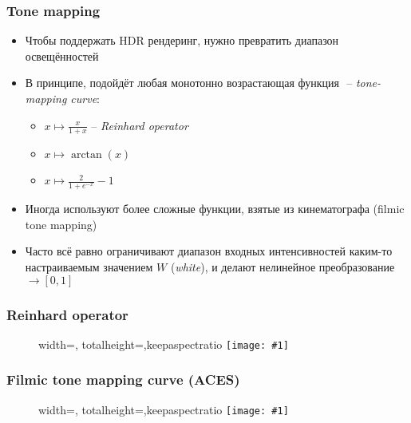 \documentclass[10pt]{beamer}
\newcommand{\slideimage}[1]{
  \begin{figure}
    \begin{adjustbox}{width=\textwidth, totalheight=\textheight-2\baselineskip-2\baselineskip,keepaspectratio}
      \texttt{[image: \#1]}
    \end{adjustbox}
  \end{figure}
}
\begin{document}
\begin{frame}[fragile]
\frametitle{Tone mapping}
\begin{itemize}
\item Чтобы поддержать HDR рендеринг, нужно превратить диапазон освещённостей \begin{math}[0, \infty)\end{math} в диапазон \begin{math}[0, 1]\end{math}
\pause
\item В принципе, подойдёт любая монотонно возрастающая функция \begin{math}[0, \infty)\rightarrow [0, 1]\end{math} -- \textit{tone-mapping curve}:
\begin{itemize}
\item \begin{math}x \mapsto \frac{x}{1+x}\end{math} -- \textit{Reinhard operator}
\item \begin{math}x \mapsto \arctan(x)\end{math}
\item \begin{math}x \mapsto \frac{2}{1+e^{-x}}-1\end{math}
\end{itemize}
\pause
\item Иногда используют более сложные функции, взятые из кинематографа (filmic tone mapping)
\pause
\item Часто всё равно ограничивают диапазон входных интенсивностей каким-то настраиваемым значением \begin{math}W\end{math} (\textit{white}), и делают нелинейное преобразование \begin{math}[0, W] \rightarrow [0, 1]\end{math}
\end{itemize}
\end{frame}

\begin{frame}[fragile]
\frametitle{Reinhard operator}
\slideimage{reinhard.png}
\end{frame}

\begin{frame}[fragile]
\frametitle{Filmic tone mapping curve (ACES)}
\slideimage{aces.png}
\end{frame}
\end{document}
